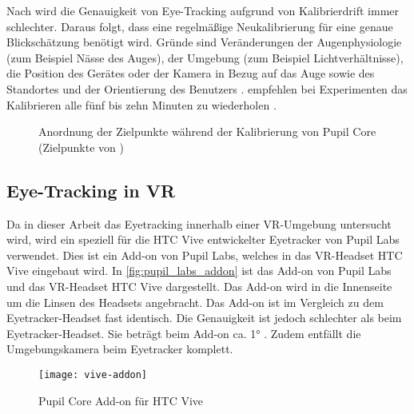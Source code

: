 Nach \citeauthor{Lander.2018} wird die Genauigkeit von Eye-Tracking aufgrund von Kalibrierdrift immer schlechter. Daraus folgt, dass eine regelmäßige Neukalibrierung für eine genaue Blickschätzung benötigt wird. \cite{Lander.2018} Gründe sind Veränderungen der Augenphysiologie (zum Beispiel Nässe des Auges), der Umgebung (zum Beispiel Lichtverhältnisse), die Position des Gerätes oder der Kamera in Bezug auf das Auge sowie des Standortes und der Orientierung des Benutzers \cite{Cerrolaza.2012}. \citeauthor{Clay_Koenig_Koenig_2019} empfehlen bei Experimenten das Kalibrieren alle fünf bis zehn Minuten zu wiederholen \cite{Clay_Koenig_Koenig_2019}. 

\begin{figure}[!htbp]
	\centering
	\caption[Anordnung der Zielpunkte während der Kalibrierung von Pupil Core]{Anordnung der Zielpunkte während der Kalibrierung von Pupil Core (Zielpunkte von \cite{PupilLabsCalibMarker})}
	\label{fig:CalibrationMarker-2D}
\end{figure}

\subsection{Eye-Tracking in VR}
Da in dieser Arbeit das Eyetracking innerhalb einer \ac{VR}-Umgebung untersucht wird, wird ein speziell für die HTC Vive entwickelter Eyetracker von Pupil Labs verwendet. Dies ist ein Add-on von Pupil Labs, welches in das \ac{VR}-Headset HTC Vive eingebaut wird. In \autoref{fig:pupil_labs_addon} ist das Add-on von Pupil Labs und das \ac{VR}-Headset HTC Vive dargestellt. Das Add-on wird in die Innenseite um die Linsen des Headsets angebracht. Das Add-on ist im Vergleich zu dem Eyetracker-Headset fast identisch. Die Genauigkeit ist jedoch schlechter als beim Eyetracker-Headset. Sie beträgt beim Add-on ca. 1° \cite{PupilLabsAddOnSpecs}. Zudem entfällt die Umgebungskamera beim Eyetracker komplett. 

\begin{figure}[!htbp]
	\centering
	\texttt{[image: vive-addon]}
	\caption[Pupil Core Add-on für HTC Vive]{Pupil Core Add-on für HTC Vive \cite{PupilLabsAddOn}}
	\label{fig:pupil_labs_addon}
\end{figure}

